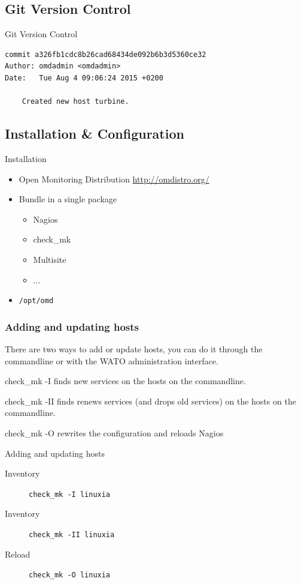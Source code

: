 \subsection{Git Version Control}
\begin{frame}[fragile]{Git Version Control}
\begin{lstlisting}
commit a326fb1cdc8b26cad68434de092b6b3d5360ce32
Author: omdadmin <omdadmin>
Date:   Tue Aug 4 09:06:24 2015 +0200

    Created new host turbine.

\end{lstlisting}
\end{frame}

\subsection{Installation \& Configuration}

\begin{frame}[fragile]{Installation}
\begin{itemize}
\item Open Monitoring Distribution \url{http://omdistro.org/}
\item Bundle in a single package
\begin{itemize}
\item Nagios
\item check\_mk
\item Multisite
\item ...
\end{itemize}
\item \verb|/opt/omd|
\end{itemize}
\end{frame}

\subsubsection{Adding and updating hosts}
There are two ways to add or update hosts, you can do
it through the commandline or with the WATO administration
interface.

check\_mk -I finds new services on the hosts on the commandline.

check\_mk -II finds renews services (and drops old services) 
on the hosts on the commandline.

check\_mk -O rewrites the configuration and reloads Nagios

\begin{frame}[fragile]{Adding and updating hosts}
\begin{description}
\item[Inventory] \verb|check_mk -I linuxia|
\item[Inventory] \verb|check_mk -II linuxia|
\item[Reload] \verb|check_mk -O linuxia|
\end{description}
\end{frame}

